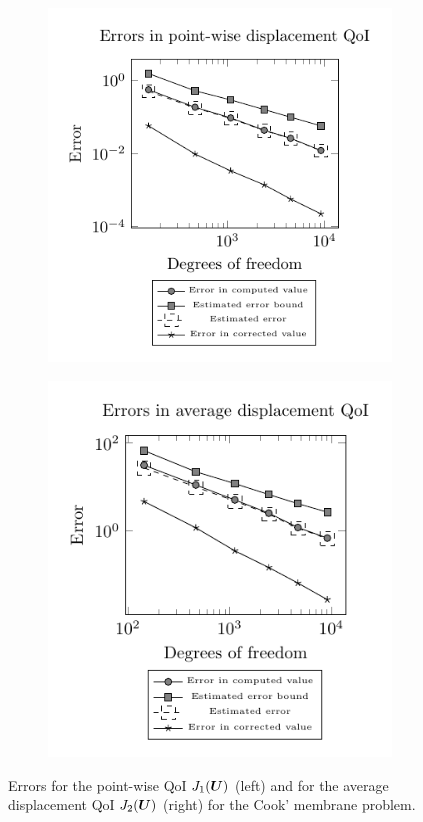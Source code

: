 \begin{figure}[ht!]
\centering
\begin{subfigure}{.5\textwidth}
\centering
\includegraphics[width=.99\linewidth]{img/mech_cooks_pw_error_plot.pdf}
\end{subfigure}%
\begin{subfigure}{.5\textwidth}
\centering
\includegraphics[width=.95\linewidth]{img/mech_cooks_avg_disp_error_plot.pdf}
\end{subfigure}
\caption{Errors for the point-wise QoI $J_1(\boldsymbol{U})$ (left) and for the
average displacement QoI $J_2(\boldsymbol{U})$ (right) for the Cook' membrane problem.}
\label{fig:mech_cooks_error}
\end{figure}

